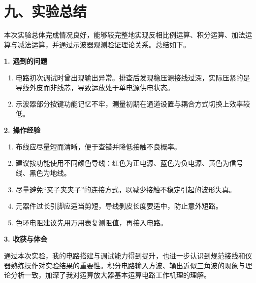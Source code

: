 \documentclass[a4paper,12pt]{article}
\begin{document}
\section*{九、实验总结}
本次实验总体完成情况良好，能够较完整地实现反相比例运算、积分运算、加法运算与减法运算，并通过示波器观测验证理论关系。总结如下。

\textbf{1. 遇到的问题}
\begin{enumerate}
    \item 电路初次调试时曾出现输出异常。排查后发现稳压源接线过深，实际压紧的是导线外皮而非线芯，导致运放处于单电源供电状态。
    \item 示波器部分按键功能记忆不牢，测量初期在通道设置与耦合方式切换上效率较低。
\end{enumerate}

\textbf{2. 操作经验}
\begin{enumerate}
    \item 布线应尽量短而清晰，便于查错并降低接触不良概率。
    \item 建议按功能使用不同颜色导线：红色为正电源、蓝色为负电源、黄色为信号线、黑色为地线。
    \item 尽量避免“夹子夹夹子”的连接方式，以减少接触不稳定引起的波形失真。
    \item 元器件过长引脚应适当剪短，导线剥皮长度要适中，防止意外短路。
    \item 色环电阻建议先用万用表复测阻值，再接入电路。
\end{enumerate}

\textbf{3. 收获与体会}

通过本次实验，我的电路搭建与调试能力得到提升，也进一步认识到规范接线和仪器熟练操作对实验结果的重要性。积分电路输入方波、输出近似三角波的现象与理论分析一致，加深了我对运算放大器基本运算电路工作机理的理解。
\end{document}
